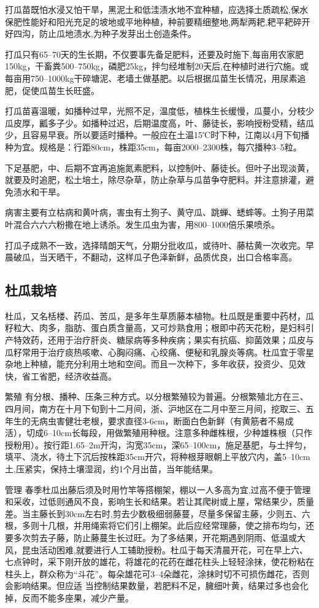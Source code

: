 \documentclass{ctexbook}
\begin{document}
打瓜苗既怕水浸又怕干旱，黑泥土和低洼渍水地不宜种植，应选择土质疏松,保水保肥性能好和阳光充足的坡地或平地种植，种前要精细整地,两犁两耙,耙平耙碎开好四沟，防止瓜地渍水,为种子发芽出土创造条件。

打瓜只有65--70天的生长期，不仅要事先备足肥料，还要及时施下,每亩用农家肥150kg，干畜粪500--750kg，磷肥25kg，拌匀经堆制20天后,在种植时进行穴施。或每亩用750--1000kg干碎塘泥、老墙土做基肥。以后根据瓜苗生长情况，用尿素追肥，促使瓜苗生长旺盛。

打瓜苗喜温暖，如播种过早，光照不足，温度低，植株生长缓慢，瓜蔓小，分枝少瓜皮厚，瓤多子少。如播种过迟，后期温度高，叶、藤徒长，影响授粉受精，结瓜少，且容易早衰。所以要适时播种。一般应在土温15℃时下种，江南以4月下旬播种为宜。规格是：行距80cm，株距35cm，每亩2000--2300株，每穴播种3--5粒。

下足基肥，中、后期不宜再追施氮素肥料，以控制叶、藤徒长。但叶子出现淡黄，就要及时追肥，松土培土，除尽杂草，防止杂草与瓜苗争夺肥料。并注意排灌，避免渍水和干旱。

病害主要有立枯病和黄叶病，害虫有土狗子、黄守瓜、跳蝉、蟋蟀等。土狗子用菜叶混合六六六粉撒在地上诱杀。发生瓜虫为害，用800--1000倍乐果喷杀。

打瓜子成熟不一致，选择晴朗天气，分期分批收瓜，或待叶、藤枯黄一次收完。早晨破瓜，当天晒干，不翻动，这样瓜子色泽新鲜，品质优良，出口合格率高。
\subsection{杜瓜栽培}
杜瓜，又名栝楼、药瓜、苦瓜，是多年生草质藤本植物。杜瓜既是重要中药材，瓜籽粒大、肉多，脂肪、蛋白质含量高，又可炒熟食用；根即中药天花粉，是妇科引产特效药，还用于治疗肝炎、糖尿病等多种疾病；果实有抗癌、抑菌效果；瓜皮与瓜籽常用于治疗痰热咳嗽、心胸闷痛、心绞痛、便秘和乳腺炎等病。杜瓜宜于零星杂地上种植，能充分利用土地和空间。而且一次种下，多年收获，投资少、见效快，省工省肥，经济收益高。

繁殖 
有分根、播种、压条三种方式。以分根繁殖较为普遍。分根繁殖北方在三、四月间，南方在十月下旬到十二月间，浙、沪地区在二月中至三月间，挖取三、五年生的无病虫害健壮老根，要求直径3-6cm，断面白色新鲜（有黄筋者不易成活），切成6--10cm长每段，用做繁殖用种根。注意多种雌株根，少种雄株根（只作授粉用）。按行距1.65--2m开沟，沟宽35cm，深65--100cm，施足基肥，与土拌匀，填平、浇水，待土下沉后按株距35cm开穴，将种根芽眼朝上平放穴内，盖5--10cm土,压紧实，保持土壤湿润，约1个月出苗，当年能结果。

管理 春季杜瓜出藤后须及时用竹竿等搭棚架，棚以一人多高为宜,过高不便于管理和采收，过低则通风不良，影响生长和结果。若让其爬树或上屋，常结果少，质量差。当主藤长到30cm左右时,剪去少数极细弱藤蔓，尽量多保留主藤，少则五、六根，多则十几根，并用绳索将它们引上棚架。此后应经常理藤，使之排布均匀，还要多次剪去子藤，防止藤蔓生长过旺。为了多结果，开花期遇到阴雨、低温或大
风，昆虫活动困难,就要进行人工辅助授粉。杜瓜于每天清晨开花，可在早上六、七点钟时，采下刚开放的雄花，将雄花的花药在雌花柱头上轻轻涂抹，使花粉粘在柱头上，群众称为“斗花”。每朵雄花可3--4朵雌花，涂抹时切不可损伤雌花，否则会影响结果。但应适
当控制结果数量，若肥料不足，臃细叶黄，结果过多也会化掉，反而不能多座果，减少产量。
\end{document}
